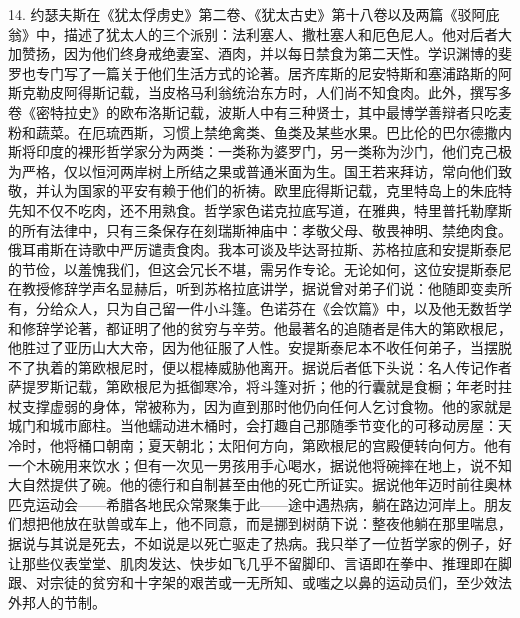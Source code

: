 14. 约瑟夫斯在《犹太俘虏史》第二卷、《犹太古史》第十八卷以及两篇《驳阿庇翁》中，描述了犹太人的三个派别：法利塞人、撒杜塞人和厄色尼人。他对后者大加赞扬，因为他们终身戒绝妻室、酒肉，并以每日禁食为第二天性。学识渊博的斐罗也专门写了一篇关于他们生活方式的论著。居齐库斯的尼安特斯和塞浦路斯的阿斯克勒皮阿得斯记载，当皮格马利翁统治东方时，人们尚不知食肉。此外，撰写多卷《密特拉史》的欧布洛斯记载，波斯人中有三种贤士，其中最博学善辩者只吃麦粉和蔬菜。在厄琉西斯，习惯上禁绝禽类、鱼类及某些水果。巴比伦的巴尔德撒内斯将印度的裸形哲学家分为两类：一类称为婆罗门，另一类称为沙门，他们克己极为严格，仅以恒河两岸树上所结之果或普通米面为生。国王若来拜访，常向他们致敬，并认为国家的平安有赖于他们的祈祷。欧里庇得斯记载，克里特岛上的朱庇特先知不仅不吃肉，还不用熟食。哲学家色诺克拉底写道，在雅典，特里普托勒摩斯的所有法律中，只有三条保存在刻瑞斯神庙中：孝敬父母、敬畏神明、禁绝肉食。俄耳甫斯在诗歌中严厉谴责食肉。我本可谈及毕达哥拉斯、苏格拉底和安提斯泰尼的节俭，以羞愧我们，但这会冗长不堪，需另作专论。无论如何，这位安提斯泰尼在教授修辞学声名显赫后，听到苏格拉底讲学，据说曾对弟子们说：他随即变卖所有，分给众人，只为自己留一件小斗篷。色诺芬在《会饮篇》中，以及他无数哲学和修辞学论著，都证明了他的贫穷与辛劳。他最著名的追随者是伟大的第欧根尼，他胜过了亚历山大大帝，因为他征服了人性。安提斯泰尼本不收任何弟子，当摆脱不了执着的第欧根尼时，便以棍棒威胁他离开。据说后者低下头说：名人传记作者萨提罗斯记载，第欧根尼为抵御寒冷，将斗篷对折；他的行囊就是食橱；年老时拄杖支撑虚弱的身体，常被称为，因为直到那时他仍向任何人乞讨食物。他的家就是城门和城市廊柱。当他蠕动进木桶时，会打趣自己那随季节变化的可移动房屋：天冷时，他将桶口朝南；夏天朝北；太阳何方向，第欧根尼的宫殿便转向何方。他有一个木碗用来饮水；但有一次见一男孩用手心喝水，据说他将碗摔在地上，说不知大自然提供了碗。他的德行和自制甚至由他的死亡所证实。据说他年迈时前往奥林匹克运动会——希腊各地民众常聚集于此——途中遇热病，躺在路边河岸上。朋友们想把他放在驮兽或车上，他不同意，而是挪到树荫下说：整夜他躺在那里喘息，据说与其说是死去，不如说是以死亡驱走了热病。我只举了一位哲学家的例子，好让那些仪表堂堂、肌肉发达、快步如飞几乎不留脚印、言语即在拳中、推理即在脚跟、对宗徒的贫穷和十字架的艰苦或一无所知、或嗤之以鼻的运动员们，至少效法外邦人的节制。\par

